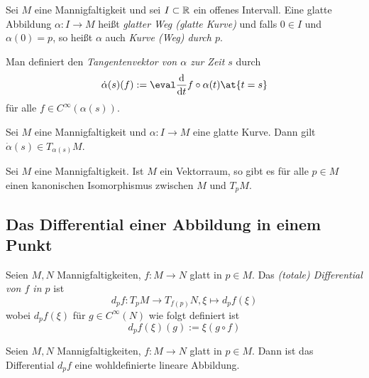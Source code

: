 \begin{definition}
  Sei $M$ eine Mannigfaltigkeit und sei $I\subset \mathbb{R}$ ein offenes Intervall. Eine glatte
  Abbildung $\alpha \colon I \to M$ heißt \emph{glatter Weg (glatte
    Kurve)} und falls $0\in I$ und $\alpha(0) = p$, so heißt $\alpha$
  auch \emph{Kurve (Weg) durch $p$}.

  Man definiert den \emph{Tangentenvektor von $\alpha$ zur Zeit $s$} durch
  \begin{equation*}
    \dot\alpha(s)(f) := \eval\ddt f\circ\alpha(t)\at{t=s} 
  \end{equation*}
  für alle $f\in C^\infty(\alpha(s))$.
\end{definition}

\begin{proposition}
  Sei $M$ eine Mannigfaltigkeit und $\alpha \colon I \to M$ eine
  glatte Kurve. Dann gilt $\dot\alpha(s) \in T_{\alpha(s)}M$.
\end{proposition}

\begin{proposition}
  Sei $M$ eine Mannigfaltigkeit. Ist $M$ ein Vektorraum, so gibt es
  für alle $p\in M$
  einen kanonischen Isomorphismus zwischen $M$ und $T_pM$.
\end{proposition}

\subsection{Das Differential einer Abbildung in einem Punkt}
\label{sec:differential}

\begin{definition}
  Seien $M,N$ Mannigfaltigkeiten, $f\colon M \to N$ glatt in $p\in
  M$. Das \emph{(totale) Differential von $f$ in $p$} ist
  \begin{equation*}
    d_pf \colon T_pM \to T_{f(p)}N, \xi \mapsto d_pf(\xi)
  \end{equation*}
  wobei $d_pf(\xi)$ für $g\in C^\infty(N)$ wie folgt definiert ist
  \begin{equation*}
    d_pf(\xi)(g) := \xi(g\circ f)
  \end{equation*}
\end{definition}

\begin{proposition}
  Seien $M,N$ Mannigfaltigkeiten, $f\colon M \to N$ glatt in $p\in
  M$. Dann ist das Differential $d_pf$ eine wohldefinierte lineare Abbildung.
\end{proposition}

